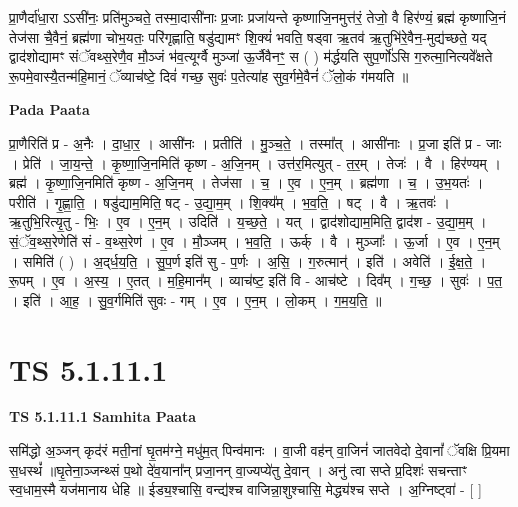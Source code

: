 \documentclass[17pt]{extarticle}
\begin{document}
प्रा॒णैर्दा॑धा॒रा ऽऽसी॑नः॒ प्रति॑मुञ्चते॒ तस्मा॒दासी॑नाः प्र॒जाः प्रजा॑यन्ते कृष्णाजि॒नमुत्त॑रं॒ तेजो॒ वै हिर॑ण्यं॒ ब्रह्म॑ कृष्णाजि॒नं तेज॑सा चै॒वैनं॒ ब्रह्म॑णा चोभ॒यतः॒ परि॑गृह्णाति॒ षडु॑द्यामꣳ शि॒क्यं॑ भवति॒ षड्वा ऋ॒तव॑ ऋ॒तुभि॑रे॒वैन॒-मुद्य॑च्छते॒ यद् द्वाद॑शोद्यामꣳ संॅवथ्स॒रेणै॒व मौ॒ञ्जं भ॑व॒त्यूर्ग्वै मुञ्जा॑ ऊ॒र्जैवैनꣳ॒॒ स ( ) म॑र्द्धयति सुप॒र्णो॑ऽसि ग॒रुत्मा॒नित्यवे᳚क्षते रू॒पमे॒वास्यै॒तन्म॑हि॒मानं॒ ॅव्याच॑ष्टे॒ दिवं॑ गच्छ॒ सुवः॑ प॒तेत्या॑ह सुव॒र्गमे॒वैनं॑ ॅलो॒कं ग॑मयति ॥ \newline

\textbf{Pada Paata} \newline

प्रा॒णैरिति॑ प्र - अ॒नैः । दा॒धा॒र॒ । आसी॑नः । प्रतीति॑ । मु॒ञ्च॒ते॒ । तस्मा᳚त् । आसी॑नाः । प्र॒जा इति॑ प्र - जाः । प्रेति॑ । जा॒य॒न्ते॒ । कृ॒ष्णा॒जि॒नमिति॑ कृष्ण - अ॒जि॒नम् । उत्त॑र॒मित्युत् - त॒र॒म् । तेजः॑ । वै । हिर॑ण्यम् । ब्रह्म॑ । कृ॒ष्णा॒जि॒नमिति॑ कृष्ण - अ॒जि॒नम् । तेज॑सा । च॒ । ए॒व । ए॒न॒म् । ब्रह्म॑णा । च॒ । उ॒भ॒यतः॑ । परीति॑ । गृ॒ह्णा॒ति॒ । षडु॑द्याम॒मिति॒ षट् - उ॒द्या॒म॒म् । शि॒क्य᳚म् । भ॒व॒ति॒ । षट् । वै । ऋ॒तवः॑ । ऋ॒तुभि॒रित्यृ॒तु - भिः॒ । ए॒व । ए॒न॒म् । उदिति॑ । य॒च्छ॒ते॒ । यत् । द्वाद॑शोद्याम॒मिति॒ द्वाद॑श - उ॒द्या॒म॒म् । सं॒ॅव॒थ्स॒रेणेति॑ सं - व॒थ्स॒रेण॑ । ए॒व । मौ॒ञ्जम् । भ॒व॒ति॒ । ऊर्क् । वै । मुञ्जाः᳚ । ऊ॒र्जा । ए॒व । ए॒न॒म् । समिति॑ ( ) । अ॒द्‌र्ध॒य॒ति॒ । सु॒प॒र्ण इति॑ सु - प॒र्णः । अ॒सि॒ । ग॒रुत्मान्॑ । इति॑ । अवेति॑ । ई॒क्ष॒ते॒ । रू॒पम् । ए॒व । अ॒स्य॒ । ए॒तत् । म॒हि॒मान᳚म् । व्याच॑ष्ट॒ इति॑ वि - आच॑ष्टे । दिव᳚म् । ग॒च्छ॒ । सुवः॑ । प॒त॒ । इति॑ । आ॒ह॒ । सु॒व॒र्गमिति॑ सुवः - गम् । ए॒व । ए॒न॒म् । लो॒कम् । ग॒म॒य॒ति॒ ॥  \newline




\section*{ TS 5.1.11.1 }

\textbf{TS 5.1.11.1 } \newline
\textbf{Samhita Paata} \newline

समि॑द्धो अ॒ञ्जन् कृद॑रं मती॒नां घृ॒तम॑ग्ने॒ मधु॑म॒त् पिन्व॑मानः । वा॒जी वह॑न् वा॒जिनं॑ जातवेदो दे॒वानां᳚ ॅवक्षि प्रि॒यमा स॒धस्थं᳚ ॥घृ॒तेना॒ञ्जन्थ्सं प॒थो दे॑व॒याना᳚न् प्रजा॒नन् वा॒ज्यप्ये॑तु दे॒वान् । अनु॑ त्वा सप्ते प्र॒दिशः॑ सचन्ताꣳ स्व॒धाम॒स्मै यज॑मानाय धेहि ॥ ईड्य॒श्चासि॒ वन्द्य॑श्च वाजिन्ना॒शुश्चासि॒ मेद्ध्य॑श्च सप्ते । अ॒ग्निष्ट्वा॑ - [  ] \newline
\end{document}
